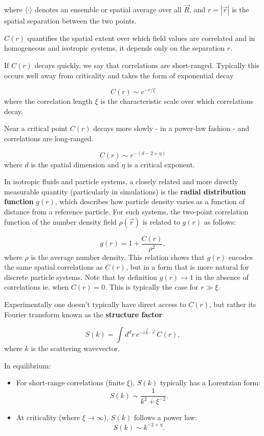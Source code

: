 \documentclass[
  letterpaper,
  enabledeprecatedfontcommands]{report}
\begin{document}
where \(\langle \cdot \rangle\) denotes an ensemble or spatial average
over all \(\vec{R}\), and \(r = |\vec{r}|\) is the spatial separation
between the two points.

\(C(r)\) quantifies the spatial extent over which field values are
correlated and in homogeneous and isotropic systems, it depends only on
the separation \(r\).

If \(C(r)\) decays quickly, we say that correlations are short-ranged.
Typically this occurs well away from criticality and takes the form of
exponential decay

\[
  C(r) \sim e^{-r/\xi}
  \] where the correlation length \(\xi\) is the characteristic scale
over which correlations decay.

Near a critical point \(C(r)\) decays more slowly - in a power-law
fashion - and correlations are long-ranged.

\[
  C(r) \sim r^{-(d - 2 + \eta)}
  \] where \(d\) is the spatial dimension and \(\eta\) is a critical
exponent.

In isotropic fluids and particle systems, a closely related and more
directly measurable quantity (particularly in simulations) is the
\textbf{radial distribution function} \(g(r)\), which describes how
particle density varies as a function of distance from a reference
particle. For such systems, the two-point correlation function of the
number density field \(\rho(\vec{r})\) is related to \(g(r)\) as
follows:

\[
g(r) = 1+\frac{C(r)}{\rho^2},
\] where \(\rho\) is the average number density. This relation shows
that \(g(r)\) encodes the same spatial correlations as \(C(r)\), but in
a form that is more natural for discrete particle systems. Note that by
definition \(g(r)\to 1\) in the absence of correlations ie. when
\(C(r)=0\). This is typically the case for \(r\gg\xi\).

Experimentally one doesn't typically have direct access to \(C(r)\), but
rather its Fourier transform known as the \textbf{structure factor}

\[
S(k) = \int d^d r \, e^{-i \vec{k} \cdot \vec{r}} \, C(r),
\] where \(k\) is the scattering wavevector.

In equilibrium:

\begin{itemize}
\item
  For short-range correlations (finite \(\xi\)), \(S(k)\) typically has
  a Lorentzian form: \[
  S(k) \sim \frac{1}{k^2 + \xi^{-2}}.
  \]
\item
  At criticality (where \(\xi \to \infty\)), \(S(k)\) follows a power
  law: \[
  S(k) \sim k^{-2 + \eta}.
  \]
\end{itemize}
\end{document}
